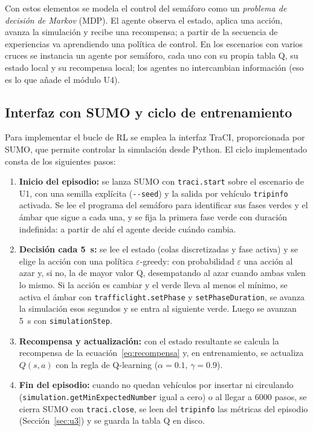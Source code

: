 Con estos elementos se modela el control del semáforo como un
\emph{problema de decisión de Markov} (MDP). El agente observa el
estado, aplica una acción, avanza la simulación y recibe una
recompensa; a partir de la secuencia de experiencias va aprendiendo
una política de control. En los escenarios con varios cruces se
instancia un agente por semáforo, cada uno con su propia tabla Q, su
estado local y su recompensa local; los agentes no intercambian
información (eso es lo que añade el módulo U4).

\subsection*{Interfaz con SUMO y ciclo de entrenamiento}

Para implementar el bucle de RL se emplea la interfaz TraCI,
proporcionada por SUMO, que permite controlar la simulación desde
Python. El ciclo implementado consta de los siguientes pasos:

\begin{enumerate}
  \item \textbf{Inicio del episodio:} se lanza SUMO con
    \verb|traci.start| sobre el escenario de U1, con una semilla
    explícita (\verb|--seed|) y la salida por vehículo \texttt{tripinfo}
    activada. Se lee el programa del semáforo para identificar sus
    fases verdes y el ámbar que sigue a cada una, y se fija la primera
    fase verde con duración indefinida: a partir de ahí el agente
    decide cuándo cambia.
  \item \textbf{Decisión cada 5~s:} se lee el estado (colas
    discretizadas y fase activa) y se elige la acción con una política
    $\varepsilon$-greedy: con probabilidad $\varepsilon$ una acción al
    azar y, si no, la de mayor valor Q, desempatando al azar cuando
    ambas valen lo mismo. Si la acción es cambiar y el verde lleva al
    menos el mínimo, se activa el ámbar con \verb|trafficlight.setPhase|
    y \verb|setPhaseDuration|, se avanza la simulación esos segundos y
    se entra al siguiente verde. Luego se avanzan 5~s con
    \verb|simulationStep|.
  \item \textbf{Recompensa y actualización:} con el estado resultante
    se calcula la recompensa de la ecuación~\ref{eq:recompensa} y, en
    entrenamiento, se actualiza $Q(s,a)$ con la regla de Q-learning
    ($\alpha = 0.1$, $\gamma = 0.9$).
  \item \textbf{Fin del episodio:} cuando no quedan vehículos por
    insertar ni circulando (\verb|simulation.getMinExpectedNumber|
    igual a cero) o al llegar a 6000 pasos, se cierra SUMO con
    \verb|traci.close|, se leen del \texttt{tripinfo} las métricas del
    episodio (Sección~\ref{sec:u3}) y se guarda la tabla Q en disco.
\end{enumerate}


